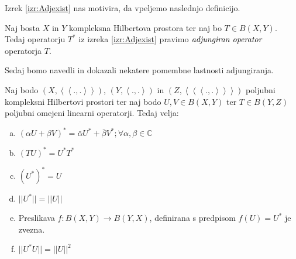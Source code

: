 \documentclass[mat2]{matdelo}
\newcommand{\C}{\mathbb{C}}
\newcommand{\abs}[1]{\ensuremath{\lvert #1 \rvert}}
\newcommand{\norm}[1]{\abs{\abs{#1}}}
\newcommand{\pojem}[1]{\ensuremath{\emph{#1}}}
\newcommand{\Sp}[2]{\ensuremath{\left<#1, #2\right>}}
\newcommand{\Spp}[2]{\ensuremath{\left<\left<#1, #2\right>\right>}}
\newcommand{\Sppp}[2]{\ensuremath{\left<\left<\left<#1, #2\right>\right>\right>}}
\newcommand{\map}[3]{\ensuremath{{#1}:{#2}\rightarrow{#3}}}
\begin{document}
			Izrek \ref{izr:Adjexist} nas motivira, da vpeljemo naslednjo definicijo.
			\begin{definicija}
				\label{def:adjop}
				Naj bosta $X$ in $Y$ kompleksna Hilbertova prostora ter naj bo $T\in B(X, Y)$. Tedaj operatorju $T^*$ iz izreka \ref{izr:Adjexist} pravimo \pojem{adjungiran operator} operatorja $T$.
			\end{definicija}
			Sedaj bomo navedli in dokazali nekatere pomembne lastnosti adjungiranja.
			
			\begin{izrek}
				\label{izr:adjlast}
				Naj bodo $(X, \Spp{.}{.})$, $(Y, \Sp{.}{.})$ in $(Z, \Sppp{.}{.})$ poljubni kompleksni Hilbertovi prostori ter naj bodo $U, V \in B(X, Y)$ ter $T \in B(Y, Z)$ poljubni omejeni linearni operatorji. Tedaj velja: \begin{enumerate}[a)]
					\item $(\alpha U + \beta V)^* = \bar{\alpha}U^* + \bar{\beta}V^*; \forall \alpha, \beta \in \C$
					\item $(TU)^* = U^*T^*$
					\item $(U^*)^* = U$
					\item $\norm{U^*} = \norm{U}$
					\item Preslikava $\map{f}{B(X, Y)}{B(Y, X)}$, definirana s predpisom $f(U) = U^*$ je zvezna.
					\item $\norm{U^*U} = \norm{U}^2$
				\end{enumerate}
			\end{izrek}
			
\end{document}
